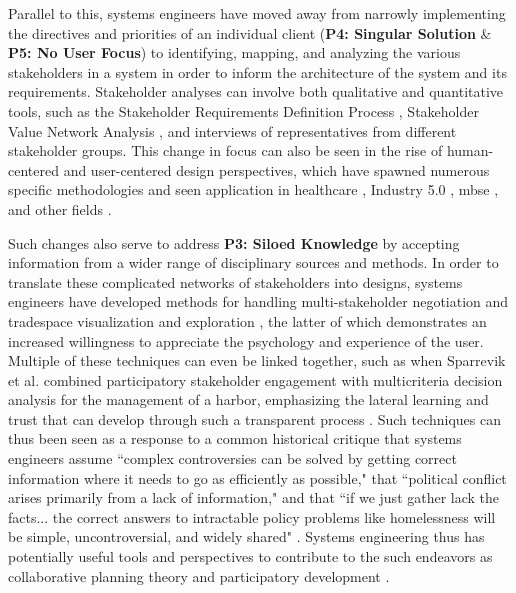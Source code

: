 Parallel to this, systems engineers have moved away from narrowly implementing the directives and priorities of an individual client (\textbf{P4: Singular Solution} \& \textbf{P5: No User Focus}) to identifying, mapping, and analyzing the various stakeholders in a system in order to inform the architecture of the system and its requirements. Stakeholder analyses can involve both qualitative and quantitative tools, such as the Stakeholder Requirements Definition Process \cite{incoseINCOSESystemsEngineering2015}, Stakeholder Value Network Analysis \cite{fengDependencyStructureMatrix2010a}, and interviews of representatives from different stakeholder groups. This change in focus can also be seen in the rise of human-centered and user-centered design perspectives, which have spawned numerous specific methodologies and seen application in healthcare \cite{samarasSystemsEngineeringPerspective2005}, Industry 5.0 \cite{longoValueOrientedEthicalTechnology2020}, \ac{mbse} \cite{kimChallengesApplyingModelbased2019}, and other fields \cite{ritterFoundationsDesigningUserCentered2014}.

Such changes also serve to address \textbf{P3: Siloed Knowledge} by accepting information from a wider range of disciplinary sources and methods. In order to translate these complicated networks of stakeholders into designs, systems engineers have developed methods for handling multi-stakeholder negotiation and \cite{fitzgeraldEffectsEnhancedMultiparty2015,fitzgeraldRecommendationsFramingMultistakeholder2016,weckMULTISTAKEHOLDERSIMULATIONGAMING2012} tradespace visualization and exploration \cite{fitzgeraldEffectsEnhancedMultiparty2015,fitzgeraldRecommendationsFramingMultistakeholder2016,groganInteractiveModelsSystem2015,rossMultiAttributeTradespaceExploration2004,selvavaleroRulebasedSystemArchitecting2012}, the latter of which demonstrates an increased willingness to appreciate the psychology and experience of the user. Multiple of these techniques can even be linked together, such as when Sparrevik et al. combined participatory stakeholder engagement with multicriteria decision analysis for the management of a harbor, emphasizing the lateral learning and trust that can develop through such a transparent process \cite{sparrevikUseMulticriteriaInvolvement2011}. Such techniques can thus been seen as a response to a common historical critique that systems engineers assume ``complex controversies can be solved by getting correct information where it needs to go as efficiently as possible," that ``political conflict arises primarily from a lack of information," and that ``if we just gather lack the facts... the correct answers to intractable policy problems like homelessness will be simple, uncontroversial, and widely shared" \cite{eubanksAutomatingInequalityHow2018}. Systems engineering thus has potentially useful tools and perspectives to contribute to the such endeavors as collaborative planning theory \cite{goodspeedDeathLifeCollaborative2016} and participatory development \cite{pertParticipatoryDevelopmentNew2013}.

